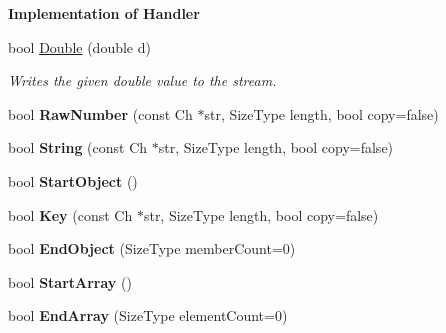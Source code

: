 \begin{Indent}{\bf Implementation of Handler}
\begin{DoxyCompactItemize}
\item 
bool \hyperlink{class_writer_a22a43e8a7193105deec6b808736f7a1a}{Double} (double d)
\begin{DoxyCompactList}\small\item\em Writes the given {\ttfamily double} value to the stream. \end{DoxyCompactList}\item 
bool {\bfseries Raw\+Number} (const Ch $\ast$str, Size\+Type length, bool copy=false)\hypertarget{class_writer_ad462dc606fddea0f34fc0e190c3bdaee}{}\label{class_writer_ad462dc606fddea0f34fc0e190c3bdaee}

\item 
bool {\bfseries String} (const Ch $\ast$str, Size\+Type length, bool copy=false)\hypertarget{class_writer_a8b4dc44f471403a83c9959575796ceab}{}\label{class_writer_a8b4dc44f471403a83c9959575796ceab}

\item 
bool {\bfseries Start\+Object} ()\hypertarget{class_writer_aec3200b2fc80ec87d1c37f775256b2e1}{}\label{class_writer_aec3200b2fc80ec87d1c37f775256b2e1}

\item 
bool {\bfseries Key} (const Ch $\ast$str, Size\+Type length, bool copy=false)\hypertarget{class_writer_a19096d2ccb90761f63ab1240337bf90a}{}\label{class_writer_a19096d2ccb90761f63ab1240337bf90a}

\item 
bool {\bfseries End\+Object} (Size\+Type member\+Count=0)\hypertarget{class_writer_a0771a565261564c27676b7300b11f2b5}{}\label{class_writer_a0771a565261564c27676b7300b11f2b5}

\item 
bool {\bfseries Start\+Array} ()\hypertarget{class_writer_a38715785194b42cd67ba5dd52bf7967e}{}\label{class_writer_a38715785194b42cd67ba5dd52bf7967e}

\item 
bool {\bfseries End\+Array} (Size\+Type element\+Count=0)\hypertarget{class_writer_ac88d533095591a878500b63b351d4013}{}\label{class_writer_ac88d533095591a878500b63b351d4013}

\end{DoxyCompactItemize}
\end{Indent}
